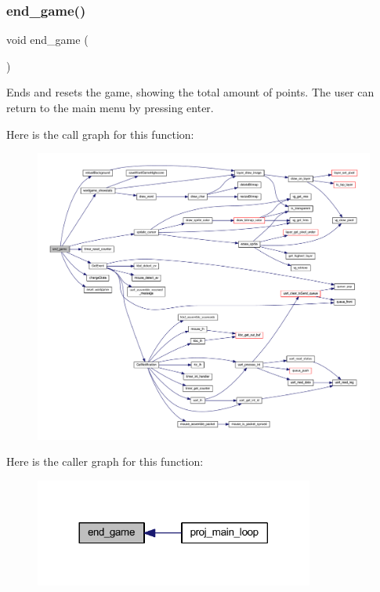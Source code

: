 \subsubsection{\texorpdfstring{end\+\_\+game()}{end\_game()}}
{\footnotesize\ttfamily void end\+\_\+game (\begin{DoxyParamCaption}{ }\end{DoxyParamCaption})}



Ends and resets the game, showing the total amount of points. The user can return to the main menu by pressing enter. 

Here is the call graph for this function\+:
\nopagebreak
\begin{figure}[H]
\begin{center}
\leavevmode
\includegraphics[width=350pt]{group__pengoo_ga4202fa5c5191c7e387d7570da6c8cd8c_cgraph}
\end{center}
\end{figure}
Here is the caller graph for this function\+:\nopagebreak
\begin{figure}[H]
\begin{center}
\leavevmode
\includegraphics[width=260pt]{group__pengoo_ga4202fa5c5191c7e387d7570da6c8cd8c_icgraph}
\end{center}
\end{figure}
\mbox{\label{group__pengoo_gaf06af764d8b387c19edc38c0effd1115}} 
